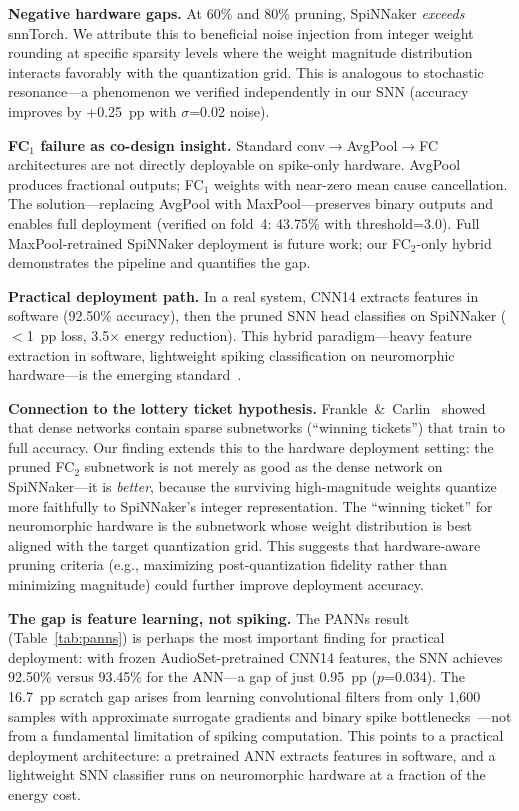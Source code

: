 \documentclass[sigconf,nonacm=false]{acmart}
\begin{document}
\textbf{Negative hardware gaps.}
At 60\% and 80\% pruning, SpiNNaker \emph{exceeds} snnTorch.
We attribute this to beneficial noise injection from integer weight rounding at specific sparsity levels where the weight magnitude distribution interacts favorably with the quantization grid.
This is analogous to stochastic resonance---a phenomenon we verified independently in our SNN (accuracy improves by +0.25~pp with $\sigma$=0.02 noise).

\textbf{FC$_1$ failure as co-design insight.}
Standard conv$\to$AvgPool$\to$FC architectures are not directly deployable on spike-only hardware.
AvgPool produces fractional outputs; FC$_1$ weights with near-zero mean cause cancellation.
The solution---replacing AvgPool with MaxPool---preserves binary outputs and enables full deployment (verified on fold~4: 43.75\% with threshold=3.0).
Full MaxPool-retrained SpiNNaker deployment is future work; our FC$_2$-only hybrid demonstrates the pipeline and quantifies the gap.

\textbf{Practical deployment path.}
In a real system, CNN14 extracts features in software (92.50\% accuracy), then the pruned SNN head classifies on SpiNNaker ($<$1~pp loss, 3.5$\times$ energy reduction).
This hybrid paradigm---heavy feature extraction in software, lightweight spiking classification on neuromorphic hardware---is the emerging standard~\cite{seekings2024}.

\textbf{Connection to the lottery ticket hypothesis.}
Frankle~\&~Carlin~\cite{frankle2019} showed that dense networks contain sparse subnetworks (``winning tickets'') that train to full accuracy.
Our finding extends this to the hardware deployment setting: the pruned FC$_2$ subnetwork is not merely as good as the dense network on SpiNNaker---it is \emph{better}, because the surviving high-magnitude weights quantize more faithfully to SpiNNaker's integer representation.
The ``winning ticket'' for neuromorphic hardware is the subnetwork whose weight distribution is best aligned with the target quantization grid.
This suggests that hardware-aware pruning criteria (e.g., maximizing post-quantization fidelity rather than minimizing magnitude) could further improve deployment accuracy.

\textbf{The gap is feature learning, not spiking.}
The PANNs result (Table~\ref{tab:panns}) is perhaps the most important finding for practical deployment: with frozen AudioSet-pretrained CNN14 features, the SNN achieves 92.50\% versus 93.45\% for the ANN---a gap of just 0.95~pp ($p$=0.034).
The 16.7~pp scratch gap arises from learning convolutional filters from only 1{,}600 samples with approximate surrogate gradients and binary spike bottlenecks~\cite{deng2020}---not from a fundamental limitation of spiking computation.
This points to a practical deployment architecture: a pretrained ANN extracts features in software, and a lightweight SNN classifier runs on neuromorphic hardware at a fraction of the energy cost.
\end{document}
